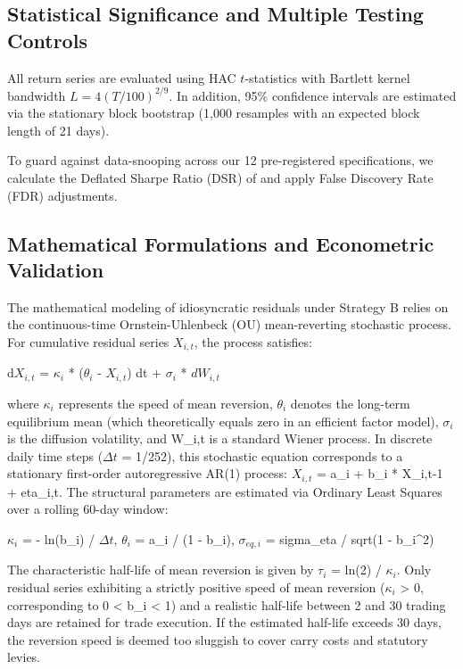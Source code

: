 \subsection{Statistical Significance and Multiple Testing Controls}
All return series are evaluated using \citet{newey1987simple} HAC $t$-statistics with Bartlett kernel bandwidth $L = 4(T/100)^{2/9}$. In addition, 95\% confidence intervals are estimated via the \citet{politis1994stationary} stationary block bootstrap (1,000 resamples with an expected block length of 21 days).

To guard against data-snooping across our 12 pre-registered specifications, we calculate the Deflated Sharpe Ratio (DSR) of \citet{bailey2014deflated} and apply \citet{benjamini1995controlling} False Discovery Rate (FDR) adjustments.


\subsection{Mathematical Formulations and Econometric Validation}
The mathematical modeling of idiosyncratic residuals under Strategy B relies on the continuous-time Ornstein-Uhlenbeck (OU) mean-reverting stochastic process. For cumulative residual series $X_{i,t}$, the process satisfies:

d$X_{i,t}$ = $\kappa_i$ * ($\theta_i$ - $X_{i,t}$) dt + $\sigma_i$ * $dW_{i,t}$

where $\kappa_i$ represents the speed of mean reversion, $\theta_i$ denotes the long-term equilibrium mean (which theoretically equals zero in an efficient factor model), $\sigma_i$ is the diffusion volatility, and W\_{i,t} is a standard Wiener process. In discrete daily time steps ($\Delta t$ = 1/252), this stochastic equation corresponds to a stationary first-order autoregressive AR(1) process: $X_{i,t}$ = a\_i + b\_i * X\_{i,t-1} + eta\_{i,t}. The structural parameters are estimated via Ordinary Least Squares over a rolling 60-day window:

$\kappa_i$ = - ln(b\_i) / $\Delta t$,   $\theta_i$ = a\_i / (1 - b\_i),   $\sigma_{eq,i}$ = sigma\_eta / sqrt(1 - b\_i^2)

The characteristic half-life of mean reversion is given by $\tau_i$ = ln(2) / $\kappa_i$. Only residual series exhibiting a strictly positive speed of mean reversion ($\kappa_i$ > 0, corresponding to 0 < b\_i < 1) and a realistic half-life between 2 and 30 trading days are retained for trade execution. If the estimated half-life exceeds 30 days, the reversion speed is deemed too sluggish to cover carry costs and statutory levies.

